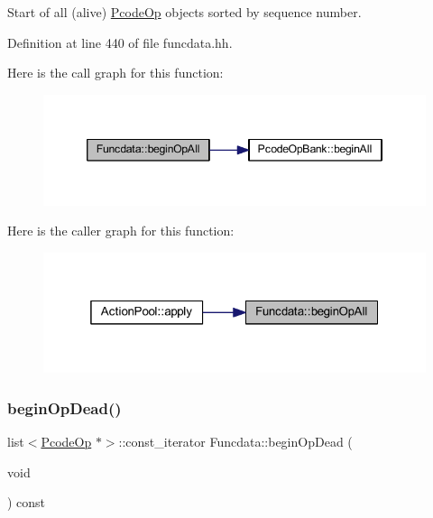 Start of all (alive) \mbox{\hyperlink{class_pcode_op}{Pcode\+Op}} objects sorted by sequence number. 



Definition at line 440 of file funcdata.\+hh.

Here is the call graph for this function\+:
\nopagebreak
\begin{figure}[H]
\begin{center}
\leavevmode
\includegraphics[width=346pt]{class_funcdata_a1bbd4329856ff0c1ae80672dfbc79d83_cgraph}
\end{center}
\end{figure}
Here is the caller graph for this function\+:
\nopagebreak
\begin{figure}[H]
\begin{center}
\leavevmode
\includegraphics[width=319pt]{class_funcdata_a1bbd4329856ff0c1ae80672dfbc79d83_icgraph}
\end{center}
\end{figure}
\mbox{\label{class_funcdata_a2f98b1b212ede713c3fe936bc2c7e2ea}} 
\subsubsection{\texorpdfstring{beginOpDead()}{beginOpDead()}}
{\footnotesize\ttfamily list$<$\mbox{\hyperlink{class_pcode_op}{Pcode\+Op}} $\ast$$>$\+::const\+\_\+iterator Funcdata\+::begin\+Op\+Dead (\begin{DoxyParamCaption}\item[{void}]{ }\end{DoxyParamCaption}) const\hspace{0.3cm}{\ttfamily [inline]}}



